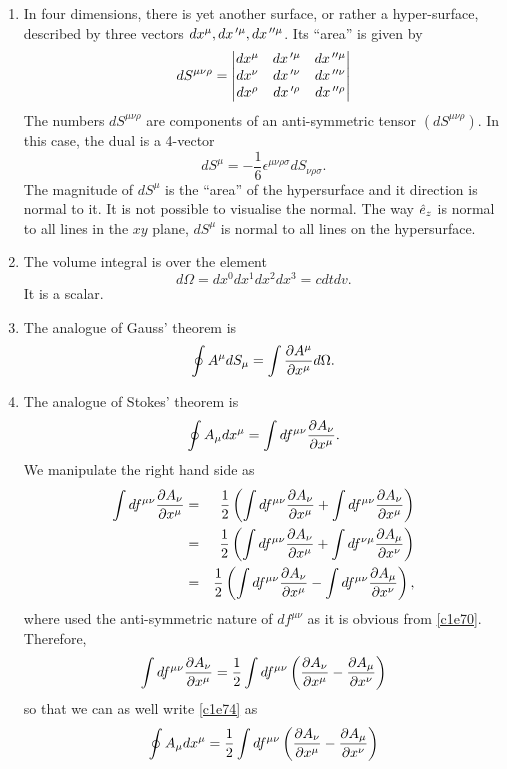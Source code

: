 \begin{enumerate}
\begin{enumerate}
\item In four dimensions, there is yet another surface, or rather a hyper-surface,
described by three vectors $dx^\mu, dx^{{\,\prime}\mu}, dx^{{\,\prime\prime}\mu}$. Its ``area'' is given
by
\begin{equation}\label{c1e71}
dS^{\mu\nu\rho} = \begin{vmatrix}
dx^\mu & dx^{{\,\prime}\mu} & dx^{{\,\prime\prime}\mu} \\
dx^\nu & dx^{{\,\prime}\nu} & dx^{{\,\prime\prime}\nu} \\
dx^\rho & dx^{{\,\prime}\rho} & dx^{{\,\prime\prime}\rho}
\end{vmatrix}
\end{equation}
The numbers $dS^{\mu\nu\rho}$ are components of an anti-symmetric tensor 
$(dS^{\mu\nu\rho})$. In this case, the dual is a 4-vector
\begin{equation}\label{c1e72}
dS^\mu = -\frac{1}{6}\epsilon^{\mu\nu\rho\sigma}dS_{\nu\rho\sigma}.
\end{equation}
The magnitude of $dS^\mu$ is the ``area'' of the hypersurface and it direction
is normal to it. It is not possible to visualise the normal. The way $\hat{e}_{z}$ is
normal to all lines in the $xy$ plane, $dS^\mu$ is normal to all lines on the
hypersurface.

\item The volume integral is over the element
\begin{equation}\label{c1e73}
d\Omega = dx^0 dx^1 dx^2 dx^3 = cdtdv.
\end{equation}
It is a scalar.

\item The analogue of Gauss' theorem is
\begin{equation}\label{c1e74}
\oint A^\mu dS_\mu = \int \frac{\partial{A^\mu}}{\partial{x^\mu}}d\Omega.
\end{equation}

\item The analogue of Stokes' theorem is
\begin{equation}\label{c1e75}
\oint A_\mu dx^\mu = \int df^{\mu\nu}\frac{\partial{A_{\nu}}}{\partial{x^\mu}}.
\end{equation}
We manipulate the right hand side as
\begin{eqnarray*}
\int df^{\mu\nu}\frac{\partial{A_{\nu}}}{\partial{x^\mu}} &=& \frac{1}{2}\left(\int df^{\mu\nu}\frac{\partial{A_{\nu}}}{\partial{x^\mu}} +
\int df^{\mu\nu}\frac{\partial{A_{\nu}}}{\partial{x^\mu}}\right) \\
&=& \frac{1}{2}\left(\int df^{\mu\nu}\frac{\partial{A_{\nu}}}{\partial{x^\mu}} + \int df^{\nu\mu}\frac{\partial{A_{\mu}}}{\partial{x^\nu}}\right) \\
&=& \frac{1}{2}\left(\int df^{\mu\nu}\frac{\partial{A_{\nu}}}{\partial{x^\mu}} - \int df^{\mu\nu}\frac{\partial{A_{\mu}}}{\partial{x^\nu}}\right),
\end{eqnarray*}
where used the anti-symmetric nature of $df^{\mu\nu}$ as it is obvious from \eqref{c1e70}.
Therefore,
\[
\int df^{\mu\nu}\frac{\partial{A_{\nu}}}{\partial{x^\mu}} = 
\frac{1}{2}\int df^{\mu\nu}\left(\frac{\partial{A_{\nu}}}{\partial{x^\mu}} - \frac{\partial{A_{\mu}}}{\partial{x^\nu}}\right)
\]
so that we can as well write \eqref{c1e74} as
\begin{equation}\label{c1e76}
\oint A_\mu dx^\mu = \frac{1}{2}\int df^{\mu\nu}\left(\frac{\partial{A_{\nu}}}{\partial{x^\mu}} - \frac{\partial{A_{\mu}}}{\partial{x^\nu}}\right)
\end{equation}


\end{enumerate}
\end{enumerate}
